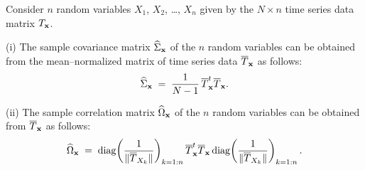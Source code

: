\begin{theorem}
Consider $n$ random variables $X_1$, $X_2$, \ldots, $X_n$ given by the $N \times n$
time series data matrix $T_{\mathbf{x}}$.

(i) The sample covariance matrix $\widehat{\Sigma}_{\mathbf{x}}$ of the $n$ random
variables can be obtained from the mean--normalized matrix of time series data
$\overline{T}_{\mathbf{x}}$ as follows:
\begin{equation}
\widehat{\Sigma}_{\mathbf{x}} \;=\; \frac{1}{N-1}\,\overline{T}^t_{\mathbf{x}}\overline{T}_{\mathbf{x}}.
\end{equation}

(ii) The sample correlation matrix $\widehat{\Omega}_{\mathbf{x}}$ of the $n$ random
variables can be obtained from $\overline{T}_{\mathbf{x}}$ as follows:
\begin{equation}
\widehat{\Omega}_{\mathbf{x}} \;=\; \operatorname{diag}\!\left(\frac{1}{\|\overline{T}_{X_k}\|}\right)_{k=1:n} \overline{T}^t_{\mathbf{x}}\overline{T}_{\mathbf{x}} \operatorname{diag}\!\left(\frac{1}{\|\overline{T}_{X_k}\|}\right)_{k=1:n}.
\end{equation}
\end{theorem}

